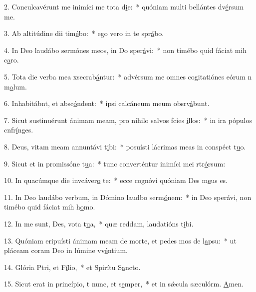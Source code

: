 2. Conculcavérunt me inimíci me tota d\uline{i}e:~* quóniam multi bellántes dv\uline{é}rsum me.\par 
3. Ab altitúdine dii tim\uline{é}bo:~* ego vero in te spr\uline{á}bo.\par 
4. In Deo laudábo sermónes meos, in Do sper\uline{á}vi:~* non timébo quid fáciat mih c\uline{a}ro.\par 
5. Tota die verba mea xsecrab\uline{á}ntur:~* advérsum me omnes cogitatiónes eórum n m\uline{a}lum.\par 
6. Inhabitábnt, et absc\uline{ó}ndent:~* ipsi calcáneum meum obsrv\uline{á}bunt.\par 
7. Sicut sustinuérunt ánimam meam, pro níhilo salvos fcies \uline{i}llos:~* in ira pópulos cnfr\uline{í}nges.\par 
8. Deus, vitam meam annuntávi t\uline{i}bi:~* posuísti lácrimas meas in conspéct t\uline{u}o.\par 
9. Sicut et in promissóne t\uline{u}a:~* tunc converténtur inimíci mei rtr\uline{ó}rsum:\par 
10. In quacúmque die invcáver\uline{o} te:~* ecce cognóvi quóniam Des m\uline{e}us es.\par 
11. In Deo laudábo verbum, in Dómino laudbo serm\uline{ó}nem:~* in Deo sperávi, non timébo quid fáciat mih h\uline{o}mo.\par 
12. In me sunt, Des, vota t\uline{u}a,~* quæ reddam, laudatións t\uline{i}bi.\par 
13. Quóniam eripuísti ánimam meam de morte, et pedes mos de l\uline{a}psu:~* ut pláceam coram Deo in lúmine vv\uline{é}ntium.\par 
14. Glória Ptri, et F\uline{í}lio,~* et Spirítu S\uline{a}ncto.\par 
15. Sicut erat in princípio, t nunc, et s\uline{e}mper,~* et in sǽcula sæculórm. \uline{A}men.\par 
